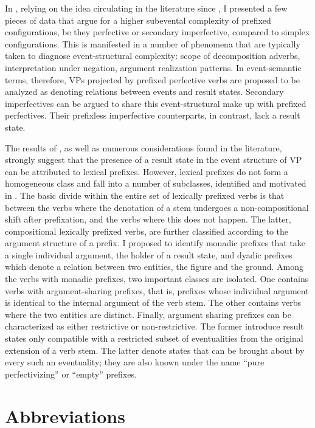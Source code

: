 \documentclass[output=paper,colorlinks,citecolor=brown]{langscibook}
\begin{document}
In , relying on the idea circulating in the literature since \citet{Klein1995}, I presented a few pieces of data that argue for a higher subevental complexity of prefixed configurations, be they perfective or secondary imperfective, compared to simplex configurations. This is manifested in a number of phenomena that are typically taken to diagnose event-structural complexity: scope of decomposition adverbs, interpretation under negation, argument realization patterns. In event-semantic terms, therefore, VPs projected by prefixed perfective verbs are proposed to be analyzed as denoting relations between events and result states. Secondary imperfectives can be argued to share this event-structural make up with prefixed perfectives. Their prefixless imperfective counterparts, in contrast, lack a result state.  

The results of , as well as numerous considerations found in the literature, strongly suggest that the presence of a result state in the event structure of VP can be attributed to lexical prefixes. However, lexical prefixes do not form a homogeneous class and fall into a number of subclasses, identified and motivated in . The basic divide within the entire set of lexically prefixed verbs is that between the verbs where the denotation of a stem undergoes a non-compositional shift after prefixation, and the verbs where this does not happen. The latter, compositional lexically prefixed verbs, are further classified according to the argument structure of a prefix. I proposed to identify monadic prefixes that take a single individual argument, the holder of a result state, and dyadic prefixes which denote a relation between two entities, the figure and the ground. Among the verbs with monadic prefixes, two important classes are isolated. One contains verbs with argument-sharing prefixes, that is, prefixes whose individual argument is identical to the internal argument of the verb stem. The other contains verbs where the two entities are distinct. Finally, argument sharing prefixes can be characterized as either restrictive or non-restrictive. The former introduce result states only compatible with a restricted subset of eventualities from the original extension of a verb stem. The latter denote states that can be brought about by every such an eventuality; they are also known under the name “pure perfectivizing” or “empty” prefixes.  

\section*{Abbreviations}
\end{document}
